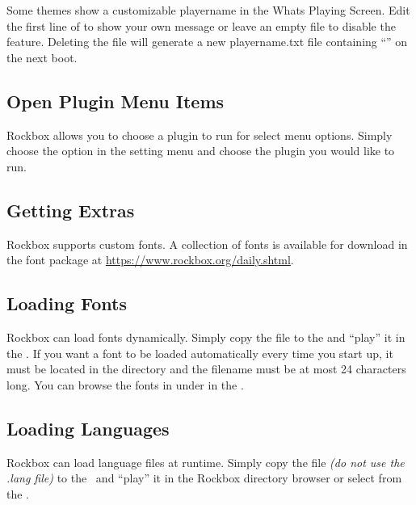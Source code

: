 Some themes show a customizable playername in the Whats Playing Screen.
Edit the first line of  to show your own message
or leave an empty file to disable the feature. Deleting the file will generate a new
playername.txt file containing ``\playername'' on the next boot.

\subsection{\label{ref:OpenPlugins}Open Plugin Menu Items}

Rockbox allows you to choose a plugin to run for select menu options.
Simply choose the option in the setting menu and choose the plugin
you would like to run.

\subsection{\label{ref:GettingExtras}Getting Extras}

Rockbox supports custom fonts. A collection of fonts is available for download
in the font package at \url{https://www.rockbox.org/daily.shtml}.

\subsection{\label{ref:Loadingfonts}Loading Fonts}
Rockbox can load fonts dynamically. Simply copy the  file to the
\dap{} and ``play'' it in the . If you want a font to
be loaded automatically every time you start up, it must be located in the
 directory and the filename must be at most 24 characters
long. You can browse the fonts in  under
in the .\\


\subsection{\label{ref:Loadinglanguages}Loading Languages}
%
Rockbox can load language files at runtime. Simply copy the  file
\emph{(do not use the .lang file)} to the \dap\ and ``play'' it in the
Rockbox directory browser or select from the .\\

